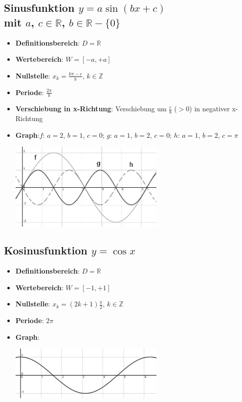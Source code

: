 \subsection*{Sinusfunktion $ y = a \sin (bx + c) $ \\ mit $ a $, $c \in \mathbb{R}$, $b \in \mathbb{R}-\{0\}$}
\begin{itemize}
	\item \textbf{Definitionsbereich}: $ D = \mathbb{R} $
	\item \textbf{Wertebereich}: $ W = [-a, +a] $
	\item \textbf{Nullstelle}: $x_k =  \frac{k\pi - c}{b} $, $k \in \mathbb{Z}$
	\item \textbf{Periode}: $\frac{2\pi}{b}$
	\item \textbf{Verschiebung in x-Richtung}: Verschiebung um $\frac{c}{b}$ ($> 0$) in negativer x-Richtung
	\item \textbf{Graph}:$f$: $a = 2$, $b=1$, $c=0$; $g$: $a=1$, $b=2$, $c=0$; $h$: $a=1$, $b=2$, $c=\pi$ \\
\begin{center}
		\includegraphics[width=0.60\textwidth]{img/SinF2.jpg}
\end{center}
\end{itemize}

\subsection*{Kosinusfunktion $y = \cos x$}
\begin{itemize}
	\item \textbf{Definitionsbereich}: $ D = \mathbb{R} $
	\item \textbf{Wertebereich}: $ W = [-1, +1] $
	\item \textbf{Nullstelle}: $x_k = (2k + 1)\frac{\pi}{2} $, $k \in \mathbb{Z}$
	\item \textbf{Periode}: $2\pi$
	\item \textbf{Graph}: \\
\begin{center}
		\includegraphics[width=0.60\textwidth]{img/CosF.jpg}
\end{center}
\end{itemize}

